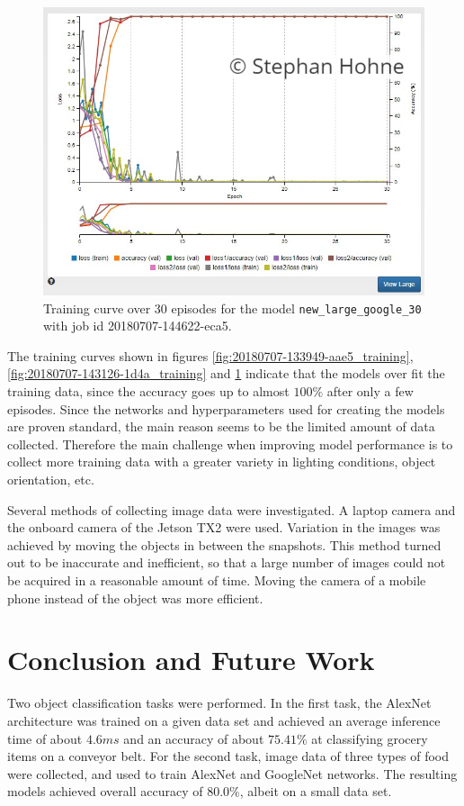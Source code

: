 \documentclass[10pt, journal, compsoc]{IEEEtran}
\newcommand{\an}{AlexNet }
\newcommand{\gn}{GoogleNet }
\begin{document}
\begin{figure}[htpb]
      \centering
      \includegraphics[width=\columnwidth]{images/training_curves/20180707-144622-eca5_training.PNG}
      \caption{Training curve over $30$ episodes for the model \texttt{new\_large\_google\_30} with job id 20180707-144622-eca5.}
      \label{fig:20180707-144622-eca5_training}
\end{figure}

The training curves shown in figures \ref{fig:20180707-133949-aae5_training}, \ref{fig:20180707-143126-1d4a_training} and \ref{fig:20180707-144622-eca5_training} indicate that the models over fit the training data, since the accuracy goes up to almost $100\%$ after only a few episodes. Since the networks and hyperparameters used for creating the models are proven standard, the main reason seems to be the limited amount of data collected. Therefore the main challenge when improving model performance is to collect more training data with a greater variety in lighting conditions, object orientation, etc.

Several methods of collecting image data were investigated. A laptop camera and the onboard camera of the Jetson TX2 were used. Variation in the images was achieved by moving the objects in between the snapshots. This method turned out to be inaccurate and inefficient, so that a large number of images could not be acquired in a reasonable amount of time. Moving the camera of a mobile phone instead of the object was more efficient.

\section{Conclusion and Future Work}
\label{sec:conclusion_future_work}
Two object classification tasks were performed. In the first task, the \an architecture was trained on a given data set and achieved an average inference time of about $4.6 ms$ and an accuracy of about $75.41\%$ at classifying grocery items on a conveyor belt. For the second task, image data of three types of food were collected, and used to train \an and \gn networks. The resulting models achieved overall accuracy of $80.0\%$, albeit on a small data set.
\end{document}
